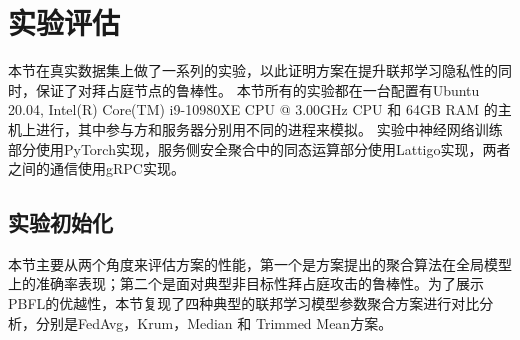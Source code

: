 \begin{table}
	\centering
	\caption{与现有方案在特定属性上的粗粒度比较}
	\label{detail-cmp}
\end{table}

\section{实验评估}\label{eva}
本节在真实数据集上做了一系列的实验，以此证明方案在提升联邦学习隐私性的同时，保证了对拜占庭节点的鲁棒性。
本节所有的实验都在一台配置有Ubuntu 20.04, Intel(R) Core(TM) i9-10980XE CPU @ 3.00GHz CPU 和 64GB RAM 的主机上进行，其中参与方和服务器分别用不同的进程来模拟。
实验中神经网络训练部分使用PyTorch实现，服务侧安全聚合中的同态运算部分使用Lattigo\cite{lattigo}实现，两者之间的通信使用gRPC实现。

\subsection{实验初始化}
本节主要从两个角度来评估方案的性能，第一个是方案提出的聚合算法在全局模型上的准确率表现；第二个是面对典型非目标性拜占庭攻击的鲁棒性。为了展示PBFL的优越性，本节复现了四种典型的联邦学习模型参数聚合方案进行对比分析，分别是FedAvg，Krum，Median 和 Trimmed Mean方案。

